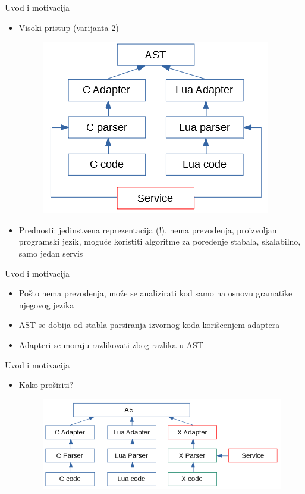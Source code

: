 \documentclass{beamer}
\begin{document}
\begin{frame}{Uvod i motivacija}
    \begin{itemize}
        \item Visoki pristup (varijanta 2)
        \begin{figure}[h!]
            \centering
            \includegraphics[scale=0.8]{images/approach_3.PNG}
        \end{figure}
        \item Prednosti: jedinstvena reprezentacija (!), nema prevođenja, proizvoljan programski jezik, mogu\'c{}e koristiti algoritme za poređenje stabala, skalabilno, samo jedan servis
    \end{itemize}
\end{frame}

\begin{frame}{Uvod i motivacija}
    \begin{itemize}
        \item Po\v{s}to nema prevođenja, mo\v{z}e se analizirati kod samo na osnovu gramatike njegovog jezika
        \item AST se dobija od stabla parsiranja izvornog koda kori\v{s}cenjem adaptera
        \item Adapteri se moraju razlikovati zbog razlika u AST
    \end{itemize}
\end{frame}

\begin{frame}{Uvod i motivacija}
    \begin{itemize}
        \item Kako pro\v{s}iriti?
        \begin{figure}[h!]
            \centering
            \includegraphics[scale=0.65]{images/approach_4.PNG}
        \end{figure}
    \end{itemize}
\end{frame}
\end{document}
